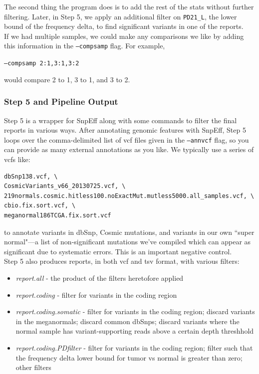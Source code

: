 \documentclass[letterpaper,14pt]{memoir}
\begin{document}
\noindent The second thing the program does is to add the rest of the stats without further filtering. Later, in Step 5, we apply an additional filter on \texttt{PD21\_L}, the lower bound of the frequency delta, to find significant variants in one of the reports.\\

\noindent If we had multiple samples, we could make any comparisons we like by adding this information in the \texttt{--compsamp} flag. For example, 

\begin{center}
\texttt{--compsamp 2:1,3:1,3:2}
\end{center}

\noindent would compare 2 to 1, 3 to 1, and 3 to 2.

\subsubsection{Step 5 and Pipeline Output}

Step 5 is a wrapper for SnpEff along with some commands to filter the final reports in various ways.
After annotating genomic features with SnpEff, Step 5 loops over the comma-delimited list of vcf files given in the \texttt{--annvcf} flag, so you can provide as many external annotations as you like.
We typically use a series of vcfs like: 

\begin{Verbatim}
dbSnp138.vcf, \
CosmicVariants_v66_20130725.vcf, \
219normals.cosmic.hitless100.noExactMut.mutless5000.all_samples.vcf, \
cbio.fix.sort.vcf, \
meganormal186TCGA.fix.sort.vcf
\end{Verbatim}

\noindent to annotate variants in dbSnp, Cosmic mutations, and variants in our own ``super normal"---a list of non-significant mutations we've compiled which can appear as significant due to systematic errors. This is an important negative control.\\

\noindent Step 5 also produces reports, in both vcf and tsv format, with various filters:

\begin{itemize}
\tightlist
\item
  \textit{report.all} - the product of the filters heretofore applied
\item
  \textit{report.coding} - filter for variants in the coding region
\item
  \textit{report.coding.somatic} - filter for variants in the coding region;
   discard variants in the meganormals;
   discard common dbSnps;
   discard variants where the normal sample has variant-supporting reads above a certain depth threshhold
\item
  \textit{report.coding.PDfilter} - filter for variants in the coding region;
   filter such that the frequency delta lower bound for tumor vs normal is greater than zero;
   other filters
\end{itemize}
\end{document}
